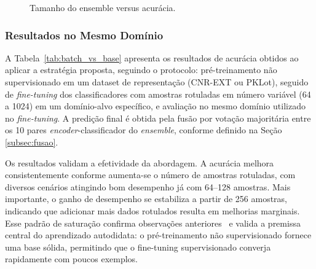 \documentclass{article}
\begin{document}
\begin{figure}[!htbp]
\caption{Tamanho do ensemble versus acurácia.}
\label{fig:ensemble-ablation}
\vspace{-3mm}
\end{figure}




\subsubsection{Resultados no Mesmo Domínio}

A Tabela~\ref{tab:batch_vs_base} apresenta os resultados de acurácia obtidos ao aplicar a estratégia proposta, seguindo o protocolo: pré-treinamento não supervisionado em um dataset de representação (CNR-EXT ou PKLot), seguido de \textit{fine-tuning} dos classificadores com amostras rotuladas em número variável (64 a 1024) em um domínio-alvo específico, e avaliação no mesmo domínio utilizado no \textit{fine-tuning}. A predição final é obtida pela fusão por votação majoritária entre os 10 pares \textit{encoder}-classificador do \textit{ensemble}, conforme definido na Seção \ref{subsec:fusao}.

Os resultados validam a efetividade da abordagem. A acurácia melhora consistentemente conforme aumenta-se o número de amostras rotuladas, com diversos cenários atingindo bom desempenho já com 64--128 amostras. Mais importante, o ganho de desempenho se estabiliza a partir de 256 amostras, indicando que adicionar mais dados rotulados resulta em melhorias marginais. Esse padrão de saturação confirma observações anteriores~\cite{SantosPKLOTGAN} e valida a premissa central do aprendizado autodidata: o pré-treinamento não supervisionado fornece uma base sólida, permitindo que o fine-tuning supervisionado converja rapidamente com poucos exemplos.
\end{document}
